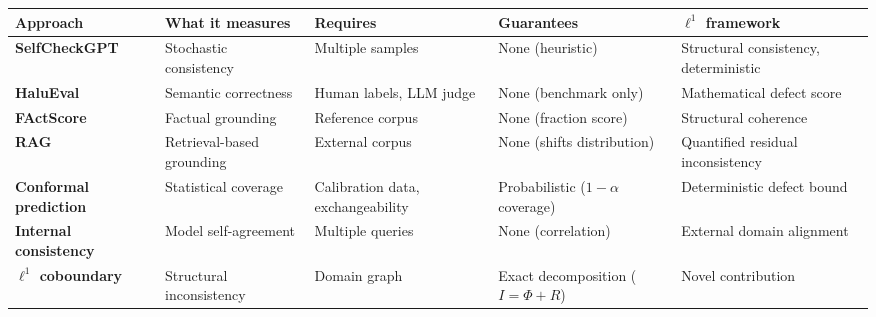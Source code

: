\documentclass[
]{article}
\begin{document}
\begin{longtable}[]{@{}
  >{\raggedright\arraybackslash}p{}
  >{\raggedright\arraybackslash}p{}
  >{\raggedright\arraybackslash}p{}
  >{\raggedright\arraybackslash}p{}
  >{\raggedright\arraybackslash}p{}@{}}
\toprule\noalign{}
\begin{minipage}[b]{\linewidth}\raggedright
Approach
\end{minipage} & \begin{minipage}[b]{\linewidth}\raggedright
What it measures
\end{minipage} & \begin{minipage}[b]{\linewidth}\raggedright
Requires
\end{minipage} & \begin{minipage}[b]{\linewidth}\raggedright
Guarantees
\end{minipage} & \begin{minipage}[b]{\linewidth}\raggedright
\(\ell^1\) framework
\end{minipage} \\
\midrule\noalign{}
\endhead
\bottomrule\noalign{}
\endlastfoot
\textbf{SelfCheckGPT} & Stochastic consistency & Multiple samples & None
(heuristic) & Structural consistency, deterministic \\
\textbf{HaluEval} & Semantic correctness & Human labels, LLM judge &
None (benchmark only) & Mathematical defect score \\
\textbf{FActScore} & Factual grounding & Reference corpus & None
(fraction score) & Structural coherence \\
\textbf{RAG} & Retrieval-based grounding & External corpus & None
(shifts distribution) & Quantified residual inconsistency \\
\textbf{Conformal prediction} & Statistical coverage & Calibration data,
exchangeability & Probabilistic (\(1-\alpha\) coverage) & Deterministic
defect bound \\
\textbf{Internal consistency} & Model self-agreement & Multiple queries
& None (correlation) & External domain alignment \\
\textbf{\(\ell^1\) coboundary} & Structural inconsistency & Domain graph
& Exact decomposition (\(I = \Phi + R\)) & Novel contribution \\
\end{longtable}
\end{document}
